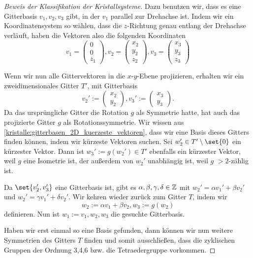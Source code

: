 \begin{proof}[Beweis der Klassifikation der Kristallsysteme]
\medbreak
Dazu benutzen wir, dass es eine Gitterbasis $v_1,v_2,v_3$ gibt, in der $v_1$ parallel zur Drehachse ist. Indem wir ein Koordinatensystem so wählen, dass die $z$-Richtung genau entlang der Drehachse verläuft, haben die Vektoren also die folgenden Koordinaten
\[v_1 = \begin{pmatrix} 0 \\ 0 \\ z_1 \end{pmatrix}, v_2 = \begin{pmatrix} x_2 \\ y_2 \\ z_2 \end{pmatrix}, v_3 = \begin{pmatrix} x_3 \\ y_3 \\ z_3 \end{pmatrix}\]

Wenn wir nun alle Gittervektoren in die $x$-$y$-Ebene projizieren, erhalten wir ein zweidimensionales Gitter $T'$, mit Gitterbasis
\[v_2' := \begin{pmatrix} x_2 \\ y_2\end{pmatrix}, v_3' := \begin{pmatrix} x_3 \\ y_3 \end{pmatrix}.\]
Da das ursprüngliche Gitter die Rotation $g$ als Symmetrie hatte, hat auch das projizierte Gitter $g$ als Rotationssymmetrie. Wir wissen aus \ref{kristalle:gitterbasen_2D_kuerzeste_vektoren}, dass wir eine Basis dieses Gitters finden können, indem wir kürzeste Vektoren suchen. Sei $w_2'\in T'\setminus\set{0}$ ein kürzester Vektor. Dann ist $w_3':=g(w_2')\in T'$ ebenfalls ein kürzester Vektor, weil $g$ eine Isometrie ist, der außerdem von $w_2'$ unabhängig ist, weil $g$ $>2$-zählig ist.

Da $\set{v_2',v_3'}$ eine Gitterbasis ist, gibt es $\alpha,\beta,\gamma,\delta\in\mathbb{Z}$ mit $w_2'=\alpha v_1'+\beta v_2'$ und $w_2'=\gamma v_1'+\delta v_2'$. Wir kehren wieder zurück zum Gitter $T$, indem wir
\[w_2:=\alpha v_1+\beta v_2, w_3 := g(w_2)\]
definieren. Nun ist $w_1:=v_1, w_2,w_3$ die gesuchte Gitterbasis.

\bigbreak
Haben wir erst einmal so eine Basis gefunden, dann können wir nun weitere Symmetrien des Gitters $T$ finden und somit ausschließen, dass die zyklischen Gruppen der Ordnung 3,4,6 bzw. die Tetraedergruppe vorkommen.


\end{proof}
